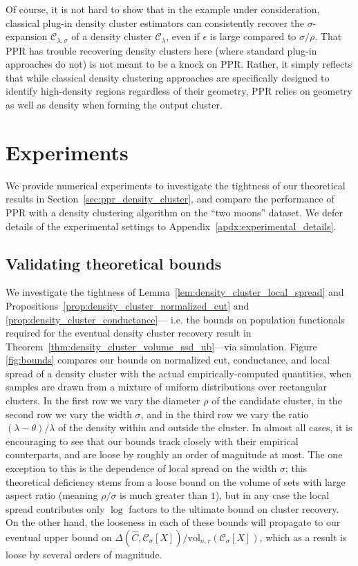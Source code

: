 \documentclass[11pt,twoside]{article}
\theoremstyle{definition}
\newcommand{\1}{\mathbf{1}}
\newcommand{\mc}[1]{\mathcal{#1}}
\newcommand{\wh}[1]{\widehat{#1}}
\newcommand{\vol}{\mathrm{vol}}
\begin{document}
Of course, it is not hard to show that in the example under consideration, classical
plug-in density cluster estimators can consistently recover the
$\sigma$-expansion $\mc{C}_{\lambda,\sigma}$ of a density cluster $\mc{C}_{\lambda}$, even if $\epsilon$ is
large compared to $\sigma/\rho$. That PPR has trouble recovering density
clusters here (where standard plug-in approaches do not) is not meant to
be a knock on PPR. Rather, it simply reflects that while classical density
clustering approaches are specifically designed to identify high-density regions
regardless of their geometry, PPR relies on geometry as well as density when
forming the output cluster. 

\section{Experiments}
\label{sec:experiments}
We provide numerical experiments to investigate the tightness of our theoretical results in Section~\ref{sec:ppr_density_cluster}, and compare the performance of PPR with a density clustering algorithm on the ``two moons'' dataset. We defer details of the experimental settings to Appendix~\ref{apdx:experimental_details}.   

\subsection{Validating theoretical bounds}
We investigate the tightness of Lemma~\ref{lem:density_cluster_local_spread} and Propositions~\ref{prop:density_cluster_normalized_cut} and \ref{prop:density_cluster_conductance}--- i.e. the bounds on population functionals required for the eventual density cluster recovery result in Theorem~\ref{thm:density_cluster_volume_ssd_ub}---via simulation. Figure \ref{fig:bounds} compares our bounds on normalized cut, conductance, and local spread of a density cluster with the actual empirically-computed quantities, when samples are drawn from a mixture of uniform distributions over rectangular clusters. In the first row we vary the diameter $\rho$ of the candidate cluster, in the second row we vary the width $\sigma$, and in the third row we vary the ratio $(\lambda - \theta)/\lambda$ of the density within and outside the cluster. In almost all cases, it is encouraging to see that our bounds track closely with their empirical counterparts, and are loose by roughly an order of magnitude at most. The one exception to this is the dependence of local spread on the width $\sigma$; this theoretical deficiency stems from a loose bound on the volume of sets with large aspect ratio (meaning $\rho/\sigma$ is much greater than $1$), but in any case the local spread contributes only $\log$ factors to the ultimate bound on cluster recovery. On the other hand, the looseness in each of these bounds will propagate to our eventual upper bound on $\Delta(\wh{C},\mc{C}_{\sigma}[X])/\vol_{n,r}(\mc{C}_{\sigma}[X])$, which as a result is loose by several orders of magnitude. 
\end{document}
